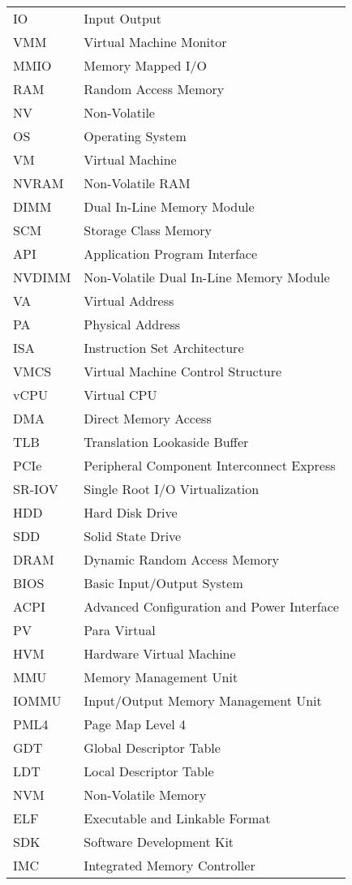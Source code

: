 \begin{tabular}{ll}
IO & Input Output \tabularnewline
VMM & Virtual Machine Monitor \tabularnewline
MMIO & Memory Mapped I/O \tabularnewline
RAM & Random Access Memory \tabularnewline
NV & Non-Volatile \tabularnewline
OS & Operating System \tabularnewline
VM & Virtual Machine \tabularnewline
NVRAM & Non-Volatile RAM \tabularnewline
DIMM & Dual In-Line Memory Module \tabularnewline
SCM & Storage Class Memory \tabularnewline
API & Application Program Interface \tabularnewline
NVDIMM & Non-Volatile Dual In-Line Memory Module \tabularnewline
VA & Virtual Address \tabularnewline
PA & Physical Address \tabularnewline
ISA & Instruction Set Architecture \tabularnewline
VMCS & Virtual Machine Control Structure \tabularnewline
vCPU & Virtual CPU \tabularnewline
DMA & Direct Memory Access \tabularnewline
TLB & Translation Lookaside Buffer \tabularnewline
PCIe & Peripheral Component Interconnect Express \tabularnewline
SR-IOV & Single Root I/O Virtualization \tabularnewline
HDD & Hard Disk Drive \tabularnewline
SDD & Solid State Drive \tabularnewline
DRAM & Dynamic Random Access Memory \tabularnewline
BIOS & Basic Input/Output System \tabularnewline
ACPI & Advanced Configuration and Power Interface \tabularnewline
PV & Para Virtual \tabularnewline
HVM & Hardware Virtual Machine \tabularnewline
MMU & Memory Management Unit \tabularnewline
IOMMU & Input/Output Memory Management Unit \tabularnewline
PML4 & Page Map Level 4 \tabularnewline
GDT & Global Descriptor Table \tabularnewline
LDT & Local Descriptor Table \tabularnewline
NVM & Non-Volatile Memory \tabularnewline
ELF & Executable and Linkable Format \tabularnewline
SDK & Software Development Kit \tabularnewline
IMC & Integrated Memory Controller \tabularnewline


\end{tabular}

\vspace{2em}


\pagebreak{}
